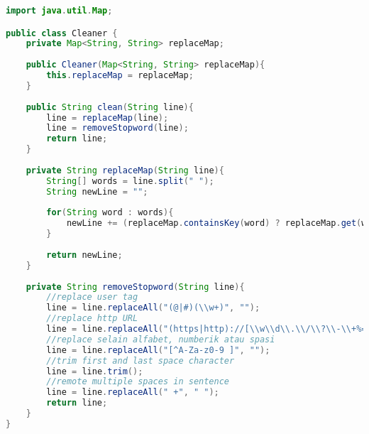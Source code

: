 \begin{lstlisting}[language=Java,basicstyle=\tiny,caption=Cleaner.java]
import java.util.Map;

public class Cleaner {
    private Map<String, String> replaceMap;
    
    public Cleaner(Map<String, String> replaceMap){
        this.replaceMap = replaceMap;
    }
    
    public String clean(String line){
        line = replaceMap(line);
        line = removeStopword(line);
        return line;
    }
    
    private String replaceMap(String line){
        String[] words = line.split(" ");
        String newLine = "";
        
        for(String word : words){
            newLine += (replaceMap.containsKey(word) ? replaceMap.get(word).toLowerCase() : word) + " ";
        }
        
        return newLine;
    }
    
    private String removeStopword(String line){
        //replace user tag
        line = line.replaceAll("(@|#)(\\w+)", "");
        //replace http URL
        line = line.replaceAll("(https|http)://[\\w\\d\\.\\/\\?\\-\\+%=&#]+", "");
        //replace selain alfabet, numberik atau spasi
        line = line.replaceAll("[^A-Za-z0-9 ]", "");
        //trim first and last space character
        line = line.trim();
        //remote multiple spaces in sentence
        line = line.replaceAll(" +", " ");
        return line;
    }
}
\end{lstlisting}

